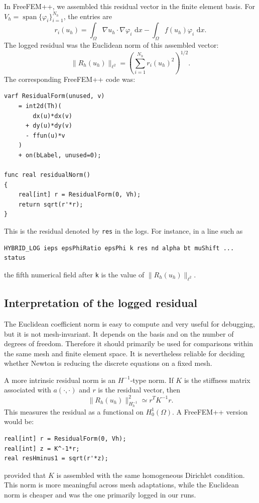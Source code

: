 \documentclass[11pt,a4paper]{article}
\newcommand{\Om}{\Omega}
\newcommand{\dd}{\,\mathrm{d}}
\begin{document}
In FreeFEM++, we assembled this residual vector in the finite element basis.
For $V_h=\operatorname{span}\{\varphi_i\}_{i=1}^{N_h}$, the entries are
\begin{equation}
  r_i(u_h)
  =\int_\Om \nabla u_h\cdot\nabla\varphi_i\,\dd x
  -\int_\Om f(u_h)\varphi_i\,\dd x.
\end{equation}
The logged residual was the Euclidean norm of this assembled vector:
\begin{equation}
  \|R_h(u_h)\|_{\ell^2}
  =\left(\sum_{i=1}^{N_h} r_i(u_h)^2\right)^{1/2}.
\end{equation}
The corresponding FreeFEM++ code was:
\begin{lstlisting}[style=ff]
varf ResidualForm(unused, v)
    = int2d(Th)(
        dx(u)*dx(v)
      + dy(u)*dy(v)
      - ffun(u)*v
    )
    + on(bLabel, unused=0);

func real residualNorm()
{
    real[int] r = ResidualForm(0, Vh);
    return sqrt(r'*r);
}
\end{lstlisting}
This is the residual denoted by \texttt{res} in the logs. For instance, in a
line such as
\begin{lstlisting}[style=ff]
HYBRID_LOG ieps epsPhiRatio epsPhi k res nd alpha bt muShift ... status
\end{lstlisting}
the fifth numerical field after \texttt{k} is the value of
$\|R_h(u_h)\|_{\ell^2}$.

\subsection{Interpretation of the logged residual}

The Euclidean coefficient norm is easy to compute and very useful for debugging,
but it is not mesh-invariant. It depends on the basis and on the number of
degrees of freedom. Therefore it should primarily be used for comparisons within
the same mesh and finite element space. It is nevertheless reliable for deciding
whether Newton is reducing the discrete equations on a fixed mesh.

A more intrinsic residual norm is an $H^{-1}$-type norm. If $K$ is the stiffness
matrix associated with $a(\cdot,\cdot)$ and $r$ is the residual vector, then
\begin{equation}
  \|R_h(u_h)\|_{H^{-1}_h}^2
  \simeq r^T K^{-1}r.
\end{equation}
This measures the residual as a functional on $H_0^1(\Om)$. A FreeFEM++ version
would be:
\begin{lstlisting}[style=ff]
real[int] r = ResidualForm(0, Vh);
real[int] z = K^-1*r;
real resHminus1 = sqrt(r'*z);
\end{lstlisting}
provided that $K$ is assembled with the same homogeneous Dirichlet condition.
This norm is more meaningful across mesh adaptations, while the Euclidean norm
is cheaper and was the one primarily logged in our runs.
\end{document}
